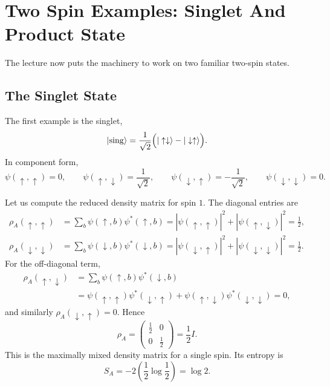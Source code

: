 \section{Two Spin Examples: Singlet And Product State}

The lecture now puts the machinery to work on two familiar two-spin states.

\subsection{The Singlet State}

The first example is the singlet,
\begin{equation}
|\mathrm{sing}\rangle
=
\frac{1}{\sqrt{2}}
\Bigl(
|\uparrow\downarrow\rangle
-
|\downarrow\uparrow\rangle
\Bigr).
\end{equation}
In component form,
\begin{equation}
\psi(\uparrow,\uparrow)=0,\qquad
\psi(\uparrow,\downarrow)=\frac{1}{\sqrt{2}},\qquad
\psi(\downarrow,\uparrow)=-\frac{1}{\sqrt{2}},\qquad
\psi(\downarrow,\downarrow)=0.
\end{equation}

Let us compute the reduced density matrix for spin \(1\). The diagonal entries are
\begin{align}
\rho_A(\uparrow,\uparrow)
&=
\sum_b \psi(\uparrow,b)\psi^*(\uparrow,b)
=
|\psi(\uparrow,\uparrow)|^2 + |\psi(\uparrow,\downarrow)|^2
=
\frac{1}{2},
\\
\rho_A(\downarrow,\downarrow)
&=
\sum_b \psi(\downarrow,b)\psi^*(\downarrow,b)
=
|\psi(\downarrow,\uparrow)|^2 + |\psi(\downarrow,\downarrow)|^2
=
\frac{1}{2}.
\end{align}
For the off-diagonal term,
\begin{align}
\rho_A(\uparrow,\downarrow)
&=
\sum_b \psi(\uparrow,b)\psi^*(\downarrow,b) \\
&=
\psi(\uparrow,\uparrow)\psi^*(\downarrow,\uparrow)
+
\psi(\uparrow,\downarrow)\psi^*(\downarrow,\downarrow)
=
0,
\end{align}
and similarly \(\rho_A(\downarrow,\uparrow)=0\). Hence
\begin{equation}
\rho_A
=
\begin{pmatrix}
\frac{1}{2} & 0 \\[4pt]
0 & \frac{1}{2}
\end{pmatrix}
=
\frac{1}{2}I.
\end{equation}
This is the maximally mixed density matrix for a single spin. Its entropy is
\begin{equation}
S_A
=
-2\left(\frac{1}{2}\log\frac{1}{2}\right)
=
\log 2.
\end{equation}

